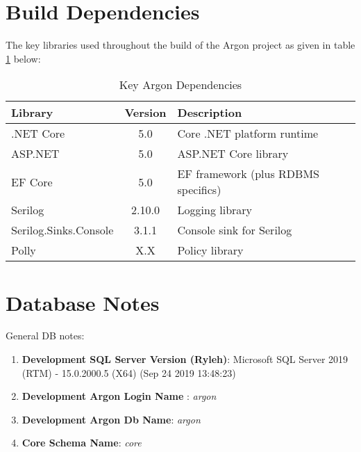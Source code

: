 \documentclass{book}
\begin{document}
\section{Build Dependencies}
The key libraries used throughout the build of the Argon project as given in table \ref{table:1} below:
\begin{table}[h!]
    \centering
    \begin{tabular}{||l | c | l ||}
        \hline
        \textbf{Library} & \textbf{Version} & \textbf{Description} \\
        \hline
        .NET Core & 5.0 & Core .NET platform runtime\\
        ASP.NET & 5.0 & ASP.NET Core library \\
        EF Core & 5.0 & EF framework (plus RDBMS specifics)\\
        Serilog & 2.10.0 & Logging library\\
        Serilog.Sinks.Console & 3.1.1 & Console sink for Serilog \\
        Polly & X.X & Policy library\\
        \hline 
    \end{tabular}
    \caption{Key Argon Dependencies}
    \label{table:1}
\end{table}

\section{Database Notes}
General DB notes:
\begin{enumerate}
    \item \textbf{Development SQL Server Version (Ryleh)}: Microsoft SQL Server 2019 (RTM) - 15.0.2000.5 (X64) (Sep 24 2019 13:48:23)
    \item \textbf{Development Argon Login Name} : \textit{argon}
    \item \textbf{Development Argon Db Name}: \textit{argon}
    \item \textbf{Core Schema Name}: \textit{core} 
\end{enumerate}
\end{document}
